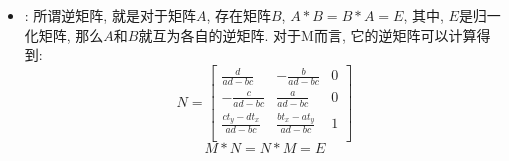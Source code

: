 {\begin {itemize}
    \item {
        {}: 所谓逆矩阵, 就是对于矩阵$A$, 存在矩阵$B$, $A * B = B * A = E$, 其中, $E$是归一化矩阵, 那么$A$和$B$就互为各自的逆矩阵. 对于M而言, 它的逆矩阵可以计算得到:
        \begin{equation}\label{inverse}
            N =
            \begin{bmatrix}
                \frac{d}{ad - bc}           &   -\frac{b}{ad - bc}          &   0\\
                -\frac{c}{ad - bc}          &   \frac{a}{ad-bc}             &   0\\
                \frac{ct_y - dt_x}{ad - bc} &  \frac{bt_x - at_y}{ad - bc}  &   1\\
            \end{bmatrix}
        \end{equation}
        \begin{equation}
            M * N = N * M = E
        \end{equation}
    }
    \end {itemize}
}

